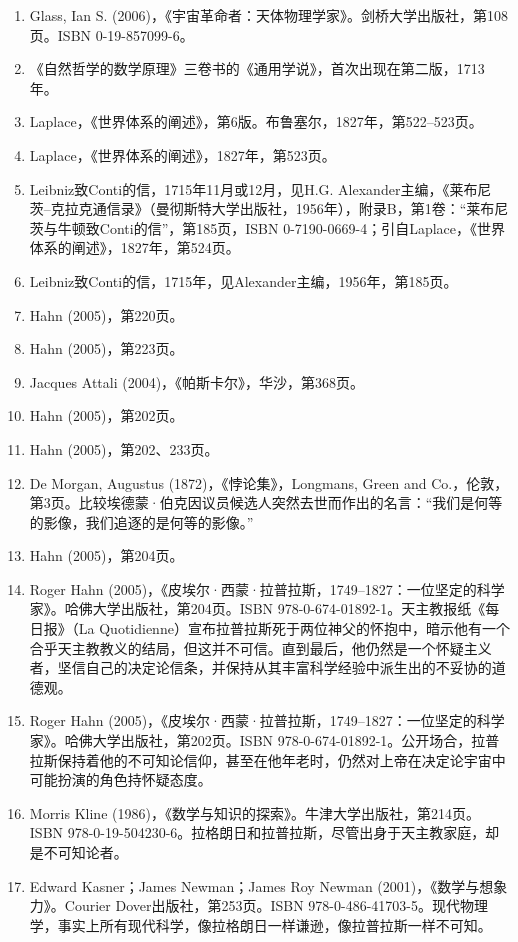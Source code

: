 \begin{enumerate}
\item Glass, Ian S. (2006)，《宇宙革命者：天体物理学家》。剑桥大学出版社，第108页。ISBN 0-19-857099-6。  
\item 《自然哲学的数学原理》三卷书的《通用学说》，首次出现在第二版，1713年。  
\item Laplace，《世界体系的阐述》，第6版。布鲁塞尔，1827年，第522–523页。  
\item Laplace，《世界体系的阐述》，1827年，第523页。  
\item Leibniz致Conti的信，1715年11月或12月，见H.G. Alexander主编，《莱布尼茨–克拉克通信录》（曼彻斯特大学出版社，1956年），附录B，第1卷：“莱布尼茨与牛顿致Conti的信”，第185页，ISBN 0-7190-0669-4；引自Laplace，《世界体系的阐述》，1827年，第524页。  
\item Leibniz致Conti的信，1715年，见Alexander主编，1956年，第185页。  
\item Hahn (2005)，第220页。  
\item Hahn (2005)，第223页。  
\item Jacques Attali (2004)，《帕斯卡尔》，华沙，第368页。  
\item Hahn (2005)，第202页。  
\item Hahn (2005)，第202、233页。  
\item De Morgan, Augustus (1872)，《悖论集》，Longmans, Green and Co.，伦敦，第3页。比较埃德蒙·伯克因议员候选人突然去世而作出的名言：“我们是何等的影像，我们追逐的是何等的影像。”
\item Hahn (2005)，第204页。  
\item Roger Hahn (2005)，《皮埃尔·西蒙·拉普拉斯，1749–1827：一位坚定的科学家》。哈佛大学出版社，第204页。ISBN 978-0-674-01892-1。天主教报纸《每日报》（La Quotidienne）宣布拉普拉斯死于两位神父的怀抱中，暗示他有一个合乎天主教教义的结局，但这并不可信。直到最后，他仍然是一个怀疑主义者，坚信自己的决定论信条，并保持从其丰富科学经验中派生出的不妥协的道德观。  
\item Roger Hahn (2005)，《皮埃尔·西蒙·拉普拉斯，1749–1827：一位坚定的科学家》。哈佛大学出版社，第202页。ISBN 978-0-674-01892-1。公开场合，拉普拉斯保持着他的不可知论信仰，甚至在他年老时，仍然对上帝在决定论宇宙中可能扮演的角色持怀疑态度。  
\item Morris Kline (1986)，《数学与知识的探索》。牛津大学出版社，第214页。ISBN 978-0-19-504230-6。拉格朗日和拉普拉斯，尽管出身于天主教家庭，却是不可知论者。  
\item Edward Kasner；James Newman；James Roy Newman (2001)，《数学与想象力》。Courier Dover出版社，第253页。ISBN 978-0-486-41703-5。现代物理学，事实上所有现代科学，像拉格朗日一样谦逊，像拉普拉斯一样不可知。  

\end{enumerate}

